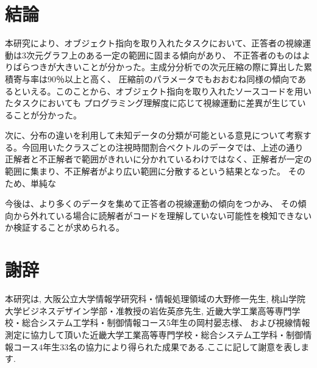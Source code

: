 \documentclass[paper=a4paper,fontsize=11pt]{jlreq}
\begin{document}
\clearpage

\part{結論}
本研究により、オブジェクト指向を取り入れたタスクにおいて、正答者の視線運動は3次元グラフ上のある一定の範囲に固まる傾向があり、
不正答者のものはよりばらつきが大きいことが分かった。主成分分析での次元圧縮の際に算出した累積寄与率は90％以上と高く、
圧縮前のパラメータでもおおむね同様の傾向であるといえる。このことから、オブジェクト指向を取り入れたソースコードを用いたタスクにおいても
プログラミング理解度に応じて視線運動に差異が生じていることが分かった。

次に、分布の違いを利用して未知データの分類が可能といる意見について考察する。今回用いたクラスごとの注視時間割合ベクトルのデータでは、上述の通り
正解者と不正解者で範囲がきれいに分かれているわけではなく、正解者が一定の範囲に集まり、不正解者がより広い範囲に分散するという結果となった。
そのため、単純な

今後は、より多くのデータを集めて正答者の視線運動の傾向をつかみ、
その傾向から外れている場合に読解者がコードを理解していない可能性を検知できないか検証することが求められる。

\pagebreak

\part*{謝辞}
本研究は,
大阪公立大学情報学研究科・情報処理領域の大野修一先生,
桃山学院大学ビジネスデザイン学部・准教授の岩佐英彦先生,
近畿大学工業高等専門学校・総合システム工学科・制御情報コース5年生の岡村晏志様、
および視線情報測定に協力して頂いた近畿大学工業高等専門学校・総合システム工学科・制御情報コース4年生33名の協力により得られた成果である.ここに記して謝意を表します.

\pagebreak
\end{document}
